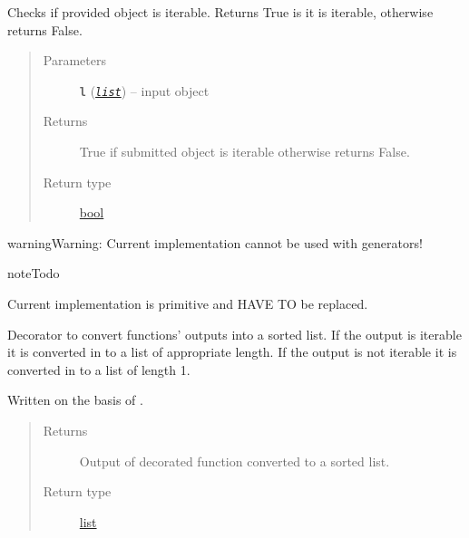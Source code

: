 \documentclass[a4paper,10pt,english]{sphinxmanual}
\begin{document}
\begin{fulllineitems}
\label{aqueduct.utils.helpers:aqueduct.utils.helpers.is_iterable}
Checks if provided object is iterable.
Returns True is it is iterable, otherwise returns False.
\begin{quote}\begin{description}
\item[{Parameters}] \leavevmode
\textbf{\texttt{l}} (\href{http://docs.python.org/2/library/functions.html\#list}{\emph{\texttt{list}}}) -- input object

\item[{Returns}] \leavevmode
True if submitted object is iterable otherwise returns False.

\item[{Return type}] \leavevmode
\href{http://docs.python.org/2/library/functions.html\#bool}{bool}

\end{description}\end{quote}

\begin{notice}{warning}{Warning:}
Current implementation cannot be used with generators!
\end{notice}

\begin{notice}{note}{Todo}

Current implementation is primitive and HAVE TO be replaced.
\end{notice}

\end{fulllineitems}


\begin{fulllineitems}
\label{aqueduct.utils.helpers:aqueduct.utils.helpers.sortify}
Decorator to convert functions' outputs into a sorted list. If the output is iterable it is converted in to a list
of appropriate length. If the output is not iterable it is converted in to a list of length 1.

Written on the basis of {\hyperref[aqueduct.utils.helpers:aqueduct.utils.helpers.listify]{}}.
\begin{quote}\begin{description}
\item[{Returns}] \leavevmode
Output of decorated function converted to a sorted list.

\item[{Return type}] \leavevmode
\href{http://docs.python.org/2/library/functions.html\#list}{list}

\end{description}\end{quote}

\end{fulllineitems}
\end{document}
